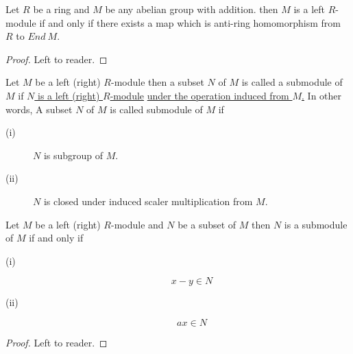 \begin{thm}
	Let $R$ be a ring and $M$ be any abelian group with addition. then $M$ is a left $R$-module if and only if there exists a map which is anti-ring homomorphism from $R$ to $End \ M$.
\end{thm}
\begin{proof}
	Left to reader.
\end{proof}
\bigskip
\begin{definition}
	Let $M$ be a left (right) $R$-module then a subset $N$ of $M$ is called a submodule of $M$ if \underline{$N$ is a left (right) $R$-module} \underline{under the operation induced from $M$.}\newline \bigskip
	In other words, A subset $N$ of $M$ is called submodule of $M$ if
	\begin{description}
		\item[(i)] $N$ is subgroup of $M$.
		\item[(ii)] $N$ is closed under induced scaler multiplication from $M$.
	\end{description}
\end{definition}
\bigskip
\begin{thm}

	Let $M$ be a left (right) $R$-module and $N$ be a subset of $M$ then $N$ is a submodule of $M$ if and only if
	\begin{description}
		\item[(i)]
		\marginnote[2.5em]{\[ \forall \ x , y  \in N \] } \[ x-y \in N \]
		\item[(ii)]
		\marginnote[2.5em]{\[ \forall \ a \in R \ \&\ x \in N \]} \[ a x \in N \]
	\end{description}
\end{thm}
\begin{proof}
	Left to reader.
\end{proof}
\bigskip
